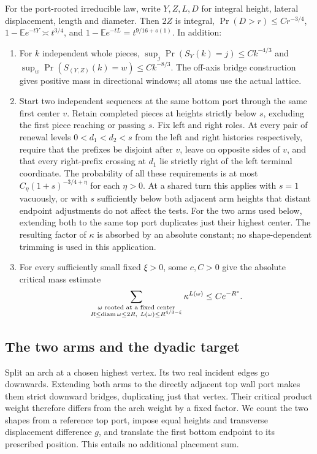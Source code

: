 \begin{proposition}\label{c:calibrated-inputs}
For the port-rooted irreducible law, write $Y,Z,L,D$ for integral height,
lateral displacement, length and diameter. Then $2Z$ is integral,
$\Pr(D>r)\le Cr^{-3/4}$,
$1-\mathbb E e^{-tY}\asymp t^{3/4}$, and
$1-\mathbb E e^{-tL}=t^{9/16+o(1)}$. In addition:
\begin{enumerate}
\item[(i)] For $k$ independent whole pieces,
$\sup_j\Pr(S_Y(k)=j)\le Ck^{-4/3}$ and
$\sup_w\Pr(S_{(Y,Z)}(k)=w)\le Ck^{-8/3}$.
The off-axis bridge construction gives positive mass in directional
windows; all atoms use the actual lattice.
\item[(ii)] Start two independent sequences at the same bottom port
through the same first center $v$. Retain completed pieces at heights
strictly below $s$, excluding the first piece reaching or passing $s$.
Fix left and right roles. At every pair of renewal levels
$0<d_1<d_2<s$ from the left and right histories respectively, require
that the prefixes be disjoint after $v$, leave on opposite sides of $v$,
and that every right-prefix crossing at $d_1$ lie strictly right of the
left terminal coordinate. The probability of all these requirements is
at most $C_\eta(1+s)^{-3/4+\eta}$ for each $\eta>0$.
At a shared turn this applies with $s=1$ vacuously, or with $s$
sufficiently below both adjacent arm heights that distant endpoint
adjustments do not affect the tests. For the two arms used below, extending both to the same top port
duplicates just their highest center. The resulting factor of $\kappa$
is absorbed by an absolute constant; no shape-dependent trimming is
used in this application.
\item[(iii)] For every sufficiently small fixed $\xi>0$, some $c,C>0$
give the absolute critical mass estimate
\[
 \sum_{\substack{\omega\text{ rooted at a fixed center}\\
 R\le\operatorname{diam}\omega\le2R,\ L(\omega)\le R^{4/3-\xi}}}
 \kappa^{L(\omega)}\le C e^{-R^c}.
\]
\end{enumerate}
\end{proposition}

\subsection{The two arms and the dyadic target}
Split an arch at a chosen highest vertex. Its two real incident edges go
downwards. Extending both arms to the directly adjacent top wall port
makes them strict downward bridges, duplicating just that vertex. Their
critical product weight therefore differs from the arch weight by a
fixed factor. We count the two shapes from a reference top port, impose
equal heights and transverse displacement difference $g$, and translate
the first bottom endpoint to its prescribed position. This entails no
additional placement sum.

